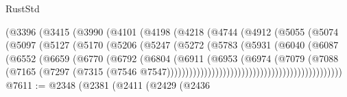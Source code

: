 \begin{lexlean}{RustStd}
\begin{coremodule}
                              (@3396
                                (@3415
                                  (@3990
                                    (@4101
                                      (@4198
                                        (@4218
                                          (@4744
                                            (@4912
                                              (@5055
                                                (@5074
                                                  (@5097
                                                    (@5127
                                                      (@5170
                                                        (@5206
                                                          (@5247
                                                            (@5272
                                                              (@5783
                                                                (@5931
                                                                  (@6040
                                                                    (@6087
                                                                      (@6552
                                                                        (@6659
                                                                          (@6770
                                                                            (@6792
                                                                              (@6804
                                                                                (@6911
                                                                                  (@6953
                                                                                    (@6974
                                                                                      (@7079
                                                                                        (@7088
                                                                                          (@7165
                                                                                            (@7297
                                                                                              (@7315
                                                                                                (@7546
                                                                                                  @7547)))))))))))))))))))))))))))))))))))))))))))))))
@7611 := @2348
    (@2381
      (@2411
        (@2429
          (@2436

\end{coremodule}
\end{lexlean}
